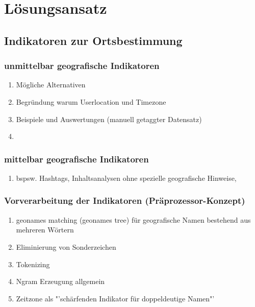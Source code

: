 \chapter{Lösungsansatz} 

\section{Indikatoren zur Ortsbestimmung}

	\subsection{unmittelbar geografische Indikatoren}
		\begin{enumerate}
			\item Mögliche Alternativen
			\item Begründung warum Userlocation und Timezone
			\item Beispiele und Auswertungen (manuell getaggter Datensatz)
			\item \cite{Hecht2011} 
		\end{enumerate}

	\subsection{mittelbar geografische Indikatoren}
		\begin{enumerate}
			\item bspsw. Hashtags, Inhaltsanalysen ohne spezielle geografische Hinweise, 
		\end{enumerate}

	\subsection{Vorverarbeitung der Indikatoren (Präprozessor-Konzept)}
		\begin{enumerate}
			\item geonames matching (geonames tree) für geografische Namen bestehend aus mehreren Wörtern
			\item Eliminierung von Sonderzeichen
			\item Tokenizing
			\item Ngram Erzeugung allgemein
			\item {} Zeitzone als "'schärfenden Indikator für doppeldeutige Namen"'
		\end{enumerate}


